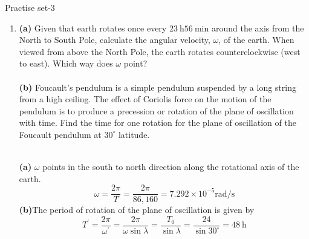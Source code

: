 \begin{abox}
	Practise set-3 
\end{abox}
\begin{enumerate} [label=\color{ocre}\textbf{\arabic*.}]
	\item \textbf{(a)} Given that earth rotates once every $23 \mathrm{~h} 56 \mathrm{~min}$ around the axis from the North to South Pole, calculate the angular velocity, $\omega$, of the earth. When viewed from above the North Pole, the earth rotates counterclockwise (west to east). Which way does $\omega$ point?\\\\
	\textbf{(b)} Foucault's pendulum is a simple pendulum suspended by a long string from a high ceiling. The effect of Coriolis force on the motion of the pendulum is to produce a precession or rotation of the plane of oscillation with time. Find the time for one rotation for the plane of oscillation of the Foucault pendulum at $30^{\circ}$ latitude.
	\begin{answer}
		$ \left. \right.$\\\\
\textbf{(a)}  $\omega$ points in the south to north direction along the rotational axis of the earth.
	\begin{equation*}
\omega=\frac{2 \pi}{T}=\frac{2 \pi}{86,160}=7.292 \times 10^{-5} \mathrm{rad} / \mathrm{s}
	\end{equation*}
\textbf{(b)}The period of rotation of the plane of oscillation is given by
	\begin{equation*}
	T^{\prime}=\frac{2 \pi}{\omega^{\prime}}=\frac{2 \pi}{\omega \sin \lambda}=\frac{T_{0}}{\sin \lambda}=\frac{24}{\sin 30^{\circ}}=48 \mathrm{~h}
	\end{equation*}
\end{answer}



\end{enumerate}
